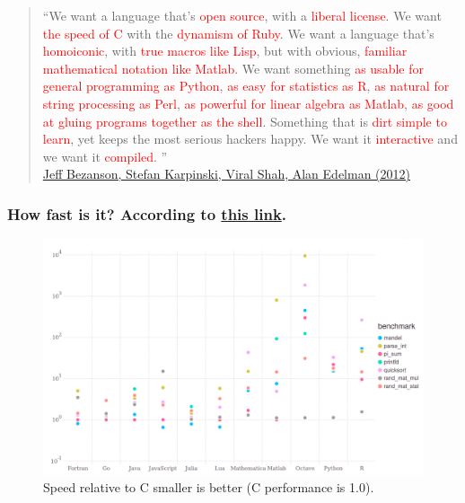 \documentclass{beamer}
\begin{document}
\begin{frame}
  \begin{quote}\footnotesize

  ``We want a language that’s \textcolor<2->{red}{open source}, with a \textcolor<3->{red}{liberal license}. We want \textcolor<4->{red}{the speed of C} with the \textcolor<5->{red}{dynamism of Ruby}. We want a language that’s \textcolor<6->{red}{homoiconic}, with \textcolor<7->{red}{true macros like Lisp}, but with obvious, \textcolor<8->{red}{familiar mathematical notation like Matlab}. We want something \textcolor<9->{red}{as usable for general programming as Python}, \textcolor<10->{red}{as easy for statistics as R}, \textcolor<11->{red}{as natural for string processing as Perl}, \textcolor<12->{red}{as powerful for linear algebra as Matlab}, \textcolor<13->{red}{as good at gluing programs together as the shell}. Something that is \textcolor<14->{red}{dirt simple to learn}, yet keeps the most serious hackers happy. We want it \textcolor<15->{red}{interactive} and we want it \textcolor<16->{red}{compiled}.
\newline
{}''\\
  \href{http://julialang.org/blog/2012/02/why-we-created-julia}{Jeff Bezanson, Stefan Karpinski, Viral Shah, Alan Edelman (2012)}
     \end{quote}
\end{frame}


\begin{frame}
  \frametitle{How fast is it? According to \href{http://julialang.org/benchmarks/}{this link}.}
  \begin{figure}[htpb]
    \centering
    \includegraphics[scale=0.2]{BenchmarkImage.png}
    \caption{Speed relative to C smaller is better (C performance is 1.0).}
    \label{fig:benchmark}
  \end{figure}
\end{frame}
\end{document}
